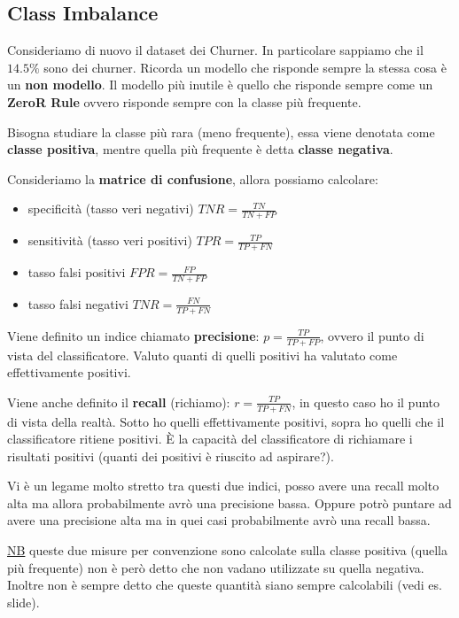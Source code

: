 \subsection{Class Imbalance}
Consideriamo di nuovo il dataset dei Churner. In particolare sappiamo che il $14.5\%$ sono dei churner. Ricorda un modello che risponde sempre la stessa cosa \`e un \textbf{non modello}. Il modello pi\`u inutile \`e quello che risponde sempre come un \textbf{ZeroR Rule} ovvero risponde sempre con la classe pi\`u frequente.

Bisogna studiare la classe pi\`u rara (meno frequente), essa viene denotata come \textbf{classe positiva}, mentre quella pi\`u frequente \`e detta \textbf{classe negativa}.

Consideriamo la \textbf{matrice di confusione}, allora possiamo calcolare:
\begin{itemize}
	\item specificit\`a (tasso veri negativi) $TNR = \frac{TN}{TN + FP}$
	\item sensitivit\`a (tasso veri positivi) $TPR = \frac{TP}{TP + FN}$
	\item tasso falsi positivi $FPR = \frac{FP}{TN + FP}$
	\item tasso falsi negativi $TNR = \frac{FN}{TP + FN}$
\end{itemize}

Viene definito un indice chiamato \textbf{precisione}: $p = \frac{TP}{TP+FP}$, ovvero il punto di vista del classificatore. Valuto quanti di quelli positivi ha valutato come effettivamente positivi. 

Viene anche definito il \textbf{recall} (richiamo): $r = \frac{TP}{TP+FN}$, in questo caso ho il punto di vista della realt\`a. Sotto ho quelli effettivamente positivi, sopra ho quelli che il classificatore ritiene positivi. \`E la capacit\`a del classificatore di richiamare i risultati positivi (quanti dei positivi \`e riuscito ad aspirare?). 

Vi \`e un legame molto stretto tra questi due indici, posso avere una recall molto alta ma allora probabilmente avrò una precisione bassa. Oppure potrò puntare ad avere una precisione alta ma in quei casi probabilmente avrò una recall bassa.

\underline{NB} queste due misure per convenzione sono calcolate sulla classe positiva (quella pi\`u frequente) non \`e per\`o detto che non vadano utilizzate su quella negativa. Inoltre non \`e sempre detto che queste quantit\`a siano sempre calcolabili (vedi es. slide).


